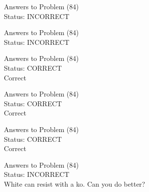 \documentclass[11pt]{article}
\begin{document}
\begin{minipage}[t]{0.5\textwidth}
  {\centering
  
  Answers to Problem (84)\\
  Status: INCORRECT\\
  
  }
\end{minipage}
\begin{minipage}[t]{0.5\textwidth}
  {\centering
  
  Answers to Problem (84)\\
  Status: INCORRECT\\
  
  }
\end{minipage}
\begin{minipage}[t]{0.5\textwidth}
  {\centering
  
  Answers to Problem (84)\\
  Status: CORRECT\\
  Correct\\
  }
\end{minipage}
\begin{minipage}[t]{0.5\textwidth}
  {\centering
  
  Answers to Problem (84)\\
  Status: CORRECT\\
  Correct\\
  }
\end{minipage}
\begin{minipage}[t]{0.5\textwidth}
  {\centering
  
  Answers to Problem (84)\\
  Status: CORRECT\\
  Correct\\
  }
\end{minipage}
\begin{minipage}[t]{0.5\textwidth}
  {\centering
  
  Answers to Problem (84)\\
  Status: INCORRECT\\
  White can resist with a ko. Can you do better?\\
  }
\end{minipage}
\end{document}
